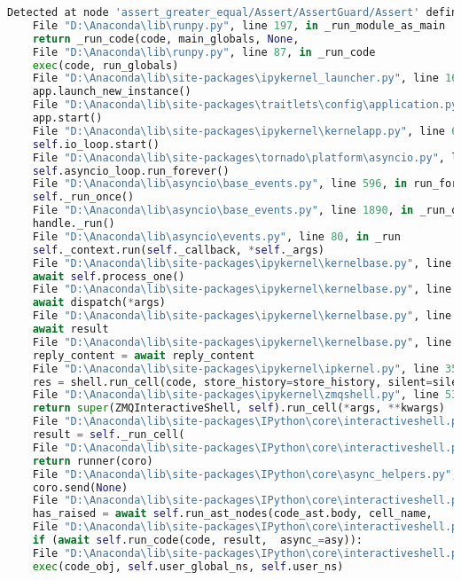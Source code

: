 \begin{lstlisting}[language=Python]
	Detected at node 'assert_greater_equal/Assert/AssertGuard/Assert' defined at (most recent call last):
	File "D:\Anaconda\lib\runpy.py", line 197, in _run_module_as_main
	return _run_code(code, main_globals, None,
	File "D:\Anaconda\lib\runpy.py", line 87, in _run_code
	exec(code, run_globals)
	File "D:\Anaconda\lib\site-packages\ipykernel_launcher.py", line 16, in <module>
	app.launch_new_instance()
	File "D:\Anaconda\lib\site-packages\traitlets\config\application.py", line 846, in launch_instance
	app.start()
	File "D:\Anaconda\lib\site-packages\ipykernel\kernelapp.py", line 677, in start
	self.io_loop.start()
	File "D:\Anaconda\lib\site-packages\tornado\platform\asyncio.py", line 199, in start
	self.asyncio_loop.run_forever()
	File "D:\Anaconda\lib\asyncio\base_events.py", line 596, in run_forever
	self._run_once()
	File "D:\Anaconda\lib\asyncio\base_events.py", line 1890, in _run_once
	handle._run()
	File "D:\Anaconda\lib\asyncio\events.py", line 80, in _run
	self._context.run(self._callback, *self._args)
	File "D:\Anaconda\lib\site-packages\ipykernel\kernelbase.py", line 457, in dispatch_queue
	await self.process_one()
	File "D:\Anaconda\lib\site-packages\ipykernel\kernelbase.py", line 446, in process_one
	await dispatch(*args)
	File "D:\Anaconda\lib\site-packages\ipykernel\kernelbase.py", line 353, in dispatch_shell
	await result
	File "D:\Anaconda\lib\site-packages\ipykernel\kernelbase.py", line 648, in execute_request
	reply_content = await reply_content
	File "D:\Anaconda\lib\site-packages\ipykernel\ipkernel.py", line 353, in do_execute
	res = shell.run_cell(code, store_history=store_history, silent=silent)
	File "D:\Anaconda\lib\site-packages\ipykernel\zmqshell.py", line 533, in run_cell
	return super(ZMQInteractiveShell, self).run_cell(*args, **kwargs)
	File "D:\Anaconda\lib\site-packages\IPython\core\interactiveshell.py", line 2901, in run_cell
	result = self._run_cell(
	File "D:\Anaconda\lib\site-packages\IPython\core\interactiveshell.py", line 2947, in _run_cell
	return runner(coro)
	File "D:\Anaconda\lib\site-packages\IPython\core\async_helpers.py", line 68, in _pseudo_sync_runner
	coro.send(None)
	File "D:\Anaconda\lib\site-packages\IPython\core\interactiveshell.py", line 3172, in run_cell_async
	has_raised = await self.run_ast_nodes(code_ast.body, cell_name,
	File "D:\Anaconda\lib\site-packages\IPython\core\interactiveshell.py", line 3364, in run_ast_nodes
	if (await self.run_code(code, result,  async_=asy)):
	File "D:\Anaconda\lib\site-packages\IPython\core\interactiveshell.py", line 3444, in run_code
	exec(code_obj, self.user_global_ns, self.user_ns)

\end{lstlisting}
